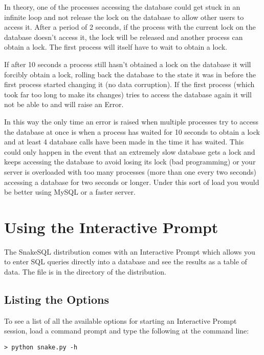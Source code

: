 \documentclass{howto}
\begin{document}
In theory, one of the processes accessing the database could get stuck in an infinite loop and not release the lock on the database to allow other users to access it. After a period of 2 seconds, if the process with the current lock on the database doesn't access it, the lock will be released and another process can obtain a lock. The first process will itself have to wait to obtain a lock.

If after 10 seconds a process still hasn't obtained a lock on the database it will forcibly obtain a lock, rolling back the database to the state it was in before the first process started changing it (no data corruption). If the first process (which took far too long to make its changes) tries to access the database again it will not be able to and will raise an Error.

In this way the only time an error is raised when multiple processes try to access the database at once is when a process has waited for 10 seconds to obtain a lock and at least 4 database calls have been made in the time it has waited. This could only happen in the event that an extremely slow database gets a lock and keeps accessing the database to avoid losing its lock (bad programming) or your server is overloaded with too many processes (more than one every two seconds) accessing a database for two seconds or longer. Under this sort of load you would be better using MySQL or a faster server.


\section{Using the Interactive Prompt}

The SnakeSQL distribution comes with an Interactive Prompt which allows you to enter SQL queries directly into a database and see the results as a table of data. The  file is in the  directory of the distribution. 

\subsection{Listing the Options}

To see a list of all the available options for starting an Interactive Prompt session, load a command prompt and type the following at the command line:

\begin{verbatim}
> python snake.py -h
\end{verbatim}
\end{document}
